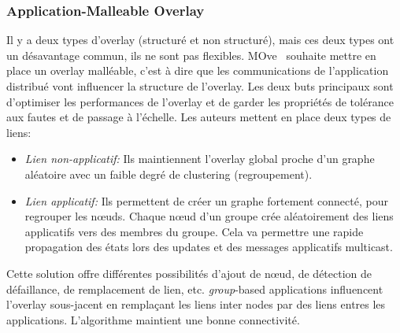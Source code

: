 		\subsubsection{Application-Malleable Overlay}
			Il y a deux types d'overlay (structuré et non structuré), mais ces deux types ont un désavantage commun, ils ne sont pas flexibles. MOve~\cite{10.1109/SRDS.2006.33} souhaite mettre en place un overlay malléable, c'est à dire que les communications de l'application distribué vont influencer la structure de l'overlay. Les deux buts principaux sont d'optimiser les performances de l'overlay et de garder les propriétés de tolérance aux fautes et de passage à l'échelle. Les auteurs mettent en place deux types de liens:
		\begin{itemize}
	        \renewcommand{\labelitemi}{$\bullet$}
	                \item \textit{Lien non-applicatif:} Ils maintiennent l'overlay global proche d'un graphe aléatoire avec un faible degré de clustering (regroupement).
        	        \item \textit{Lien applicatif:} Ils  permettent de créer un graphe fortement connecté, pour regrouper les nœuds. Chaque nœud d'un groupe crée aléatoirement des liens applicatifs vers des membres du groupe. Cela va permettre une rapide propagation des états lors des updates et des messages applicatifs multicast.
        	\end{itemize}
        Cette solution offre différentes possibilités d'ajout de nœud, de détection de défaillance, de remplacement de lien, etc. \textit{group}-based applications influencent l'overlay sous-jacent en remplaçant les liens inter nodes par des liens entres les applications. L'algorithme maintient une bonne connectivité.
